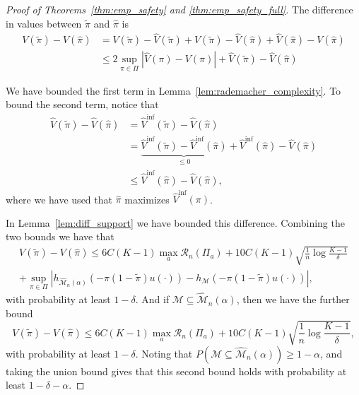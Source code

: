 \documentclass[12pt]{article}
\theoremstyle{definition}
\newcommand{\<}{\langle}
\renewcommand{\>}{\rangle}
\newcommand\mcal[1]{\ensuremath{\mathcal{#1}}}
\begin{document}
\begin{proof}[Proof of Theorems~\ref{thm:emp_safety} and \ref{thm:emp_safety_full}]
  The difference in values between $\tilde{\pi}$ and $\hat{\pi}$ is
  \[
    \begin{aligned}
      V(\tilde{\pi}) - V(\hat{\pi})
      & = V(\tilde{\pi}) - \hat{V}(\tilde{\pi}) + \hat{V}(\tilde{\pi}) - \hat{V}(\hat{\pi}) + \hat{V}(\hat{\pi}) - V(\hat\pi)\\
      & \leq 2 \sup_{\pi \in \Pi} | \hat{V}(\pi) - V(\pi) | + \hat{V}(\tilde{\pi}) - \hat{V}(\hat{\pi})
    \end{aligned}
  \]

  We have bounded the first term in Lemma~\ref{lem:rademacher_complexity}. To bound the second term, notice that
  \begin{align*}
    \hat{V}(\tilde{\pi}) - \hat{V}(\hat{\pi})  & =
    \hat{V}^{\inf}(\tilde{\pi}) - \hat{V}(\hat{\pi})\\
    & = \underbrace{\hat{V}^{\inf}(\tilde{\pi}) - \hat{V}^{\inf}(\hat{\pi})}_{\leq 0} + \hat{V}^{\inf}(\hat{\pi}) - \hat{V}(\hat{\pi})\\
    & \leq \hat{V}^{\inf}(\hat{\pi}) - \hat{V}(\hat{\pi}),
  \end{align*}
  where we have used that $\hat{\pi}$ maximizes $\hat{V}^{\inf}(\pi)$.
  
  
  In Lemma~\ref{lem:diff_support} we have bounded this difference.
    Combining the two bounds we have that
  \begin{align*}
    V(\tilde{\pi}) - V(\hat{\pi})\leq 6 C (K-1) \max_{a} \mathcal{R}_n(\Pi_a) + 10C(K-1) \sqrt{\frac{1}{n}\log \frac{K-1}{\delta}}\\
    + \sup_{\pi \in \Pi} |h_{\widehat{\mathcal{M}}_n(\alpha)}\left(-\pi (1 - \tilde{\pi}) u(\cdot)\right) - h_\mathcal{\mathcal{M}}\left(-\pi (1 - \tilde{\pi}) u(\cdot)\right)|,
  \end{align*}
  with probability at least $1 - \delta$. And if $\mathcal{M} \subseteq  \widehat{\mcal{M}}_n(\alpha)$, then we have the further bound
  \[
    V(\tilde{\pi}) - V(\hat{\pi})\leq 6 C (K-1) \max_{a} \mathcal{R}_n(\Pi_a) + 10C(K-1) \sqrt{\frac{1}{n}\log \frac{K-1}{\delta}},
  \]
  with probability at least $1 - \delta$. Noting that $P(\mathcal{M} \subseteq  \widehat{\mcal{M}}_n(\alpha)) \geq 1 - \alpha$, and taking the union bound gives that this second bound holds with probability at least $1 - \delta - \alpha$.

\end{proof}
\end{document}
